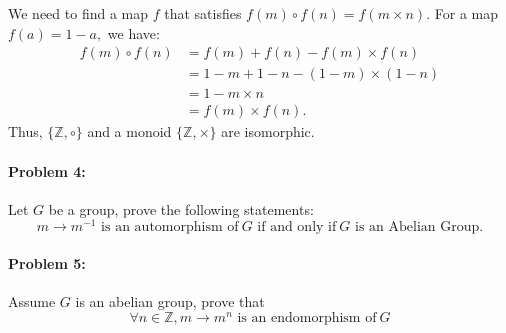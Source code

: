 \documentclass[12pt]{scrartcl}
\begin{document}
{{\begin{spacing}{1.5}
{\begin{minipage}{37.4em}
\setlength{\leftskip}{30pt}We need to find a map $f$ that satisfies $f(m) \circ f(n) = f(m \times n)$. For a map $f(a) = 1-a,$ we have:
\begin{align*}
f(m) \circ f(n) &= f(m) + f(n) - f(m) \times f(n)\\
&= 1 - m + 1 - n - (1 - m) \times (1 - n)\\
&= 1 - m \times n\\
&= f(m) \times f(n).
\end{align*}Thus, $\{\mathbb{Z}, \circ\}$ and a monoid $\{\mathbb{Z}, \times \}$ are isomorphic.
\vspace{0.5em}
	\end{minipage}}
\end{spacing}

\newpage
\paragraph*{Problem 4: }\begin{spacing}{1.5}
Let $G$ be a group, prove the following statements:
\vspace{-1em}
$$m \longrightarrow m^{-1} \text{~is an automorphism of} ~ G \text{~if and only if} ~ G \text{~is an Abelian Group.}$$
\end{spacing}

\paragraph*{Problem 5: }\begin{spacing}{1.5}
Assume $G$ is an abelian group, prove that \vspace{-1em}
$$\forall n \in \mathbb{Z}, m \longrightarrow m^n \text{~is an endomorphism of} ~ G$$
\end{spacing}}}
\end{document}
